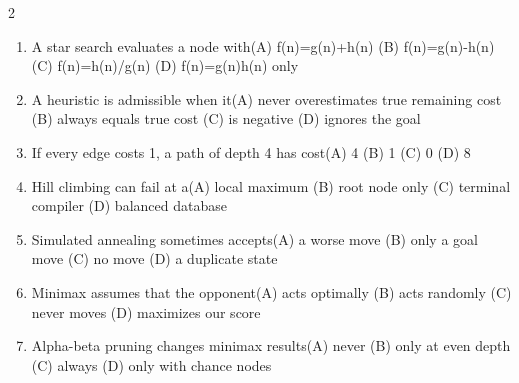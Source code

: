 \documentclass[a4paper]{article}
\begin{document}
\begin{multicols*}{2}
\begin{enumerate}
\item A star search evaluates a node with\newline\hspace*{0.6em}(A) f(n)=g(n)+h(n) \quad (B) f(n)=g(n)-h(n) \newline\hspace*{0.6em}(C) f(n)=h(n)/g(n) \quad (D) f(n)=g(n)h(n) only
\item A heuristic is admissible when it\newline\hspace*{0.6em}(A) never overestimates true remaining cost \quad (B) always equals true cost \newline\hspace*{0.6em}(C) is negative \quad (D) ignores the goal
\item If every edge costs 1, a path of depth 4 has cost\newline\hspace*{0.6em}(A) 4 \quad (B) 1 \newline\hspace*{0.6em}(C) 0 \quad (D) 8
\item Hill climbing can fail at a\newline\hspace*{0.6em}(A) local maximum \quad (B) root node only \newline\hspace*{0.6em}(C) terminal compiler \quad (D) balanced database
\item Simulated annealing sometimes accepts\newline\hspace*{0.6em}(A) a worse move \quad (B) only a goal move \newline\hspace*{0.6em}(C) no move \quad (D) a duplicate state
\item Minimax assumes that the opponent\newline\hspace*{0.6em}(A) acts optimally \quad (B) acts randomly \newline\hspace*{0.6em}(C) never moves \quad (D) maximizes our score
\item Alpha-beta pruning changes minimax results\newline\hspace*{0.6em}(A) never \quad (B) only at even depth \newline\hspace*{0.6em}(C) always \quad (D) only with chance nodes

\end{enumerate}
\end{multicols*}
\end{document}
